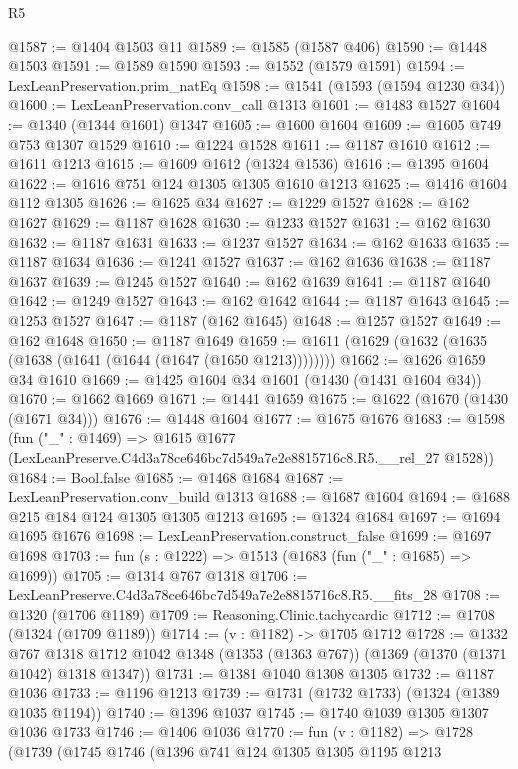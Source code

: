 \begin{lexlean}{R5}
\begin{coremodule}
@1587 := @1404 @1503 @11
@1589 := @1585 (@1587 @406)
@1590 := @1448 @1503
@1591 := @1589 @1590
@1593 := @1552 (@1579 @1591)
@1594 := LexLeanPreservation.prim_natEq
@1598 := @1541 (@1593 (@1594 @1230 @34))
@1600 := LexLeanPreservation.conv_call @1313
@1601 := @1483 @1527
@1604 := @1340 (@1344 @1601) @1347
@1605 := @1600 @1604
@1609 := @1605 @749 @753 @1307 @1529
@1610 := @1224 @1528
@1611 := @1187 @1610
@1612 := @1611 @1213
@1615 := @1609 @1612 (@1324 @1536)
@1616 := @1395 @1604
@1622 := @1616 @751 @124 @1305 @1305 @1610 @1213
@1625 := @1416 @1604 @112 @1305
@1626 := @1625 @34
@1627 := @1229 @1527
@1628 := @162 @1627
@1629 := @1187 @1628
@1630 := @1233 @1527
@1631 := @162 @1630
@1632 := @1187 @1631
@1633 := @1237 @1527
@1634 := @162 @1633
@1635 := @1187 @1634
@1636 := @1241 @1527
@1637 := @162 @1636
@1638 := @1187 @1637
@1639 := @1245 @1527
@1640 := @162 @1639
@1641 := @1187 @1640
@1642 := @1249 @1527
@1643 := @162 @1642
@1644 := @1187 @1643
@1645 := @1253 @1527
@1647 := @1187 (@162 @1645)
@1648 := @1257 @1527
@1649 := @162 @1648
@1650 := @1187 @1649
@1659 := @1611 (@1629 (@1632 (@1635 (@1638 (@1641 (@1644 (@1647 (@1650 @1213))))))))
@1662 := @1626 @1659 @34 @1610
@1669 := @1425 @1604 @34 @1601 (@1430 (@1431 @1604 @34))
@1670 := @1662 @1669
@1671 := @1441 @1659
@1675 := @1622 (@1670 (@1430 (@1671 @34)))
@1676 := @1448 @1604
@1677 := @1675 @1676
@1683 := @1598
    (fun ("_" : @1469) =>
    @1615 @1677 (LexLeanPreserve.C4d3a78ce646bc7d549a7e2e8815716c8.R5.__rel_27 @1528))
@1684 := Bool.false
@1685 := @1468 @1684
@1687 := LexLeanPreservation.conv_build @1313
@1688 := @1687 @1604
@1694 := @1688 @215 @184 @124 @1305 @1305 @1213
@1695 := @1324 @1684
@1697 := @1694 @1695 @1676
@1698 := LexLeanPreservation.construct_false
@1699 := @1697 @1698
@1703 := fun (s : @1222) => @1513 (@1683 (fun ("_" : @1685) => @1699))
@1705 := @1314 @767 @1318
@1706 := LexLeanPreserve.C4d3a78ce646bc7d549a7e2e8815716c8.R5.__fits_28
@1708 := @1320 (@1706 @1189)
@1709 := Reasoning.Clinic.tachycardic
@1712 := @1708 (@1324 (@1709 @1189))
@1714 := (v : @1182) -> @1705 @1712
@1728 := @1332
    @767
    @1318
    @1712
    @1042
    @1348
    (@1353 (@1363 @767))
    (@1369 (@1370 (@1371 @1042) @1318 @1347))
@1731 := @1381 @1040 @1308 @1305
@1732 := @1187 @1036
@1733 := @1196 @1213
@1739 := @1731 (@1732 @1733) (@1324 (@1389 @1035 @1194))
@1740 := @1396 @1037
@1745 := @1740 @1039 @1305 @1307 @1036 @1733
@1746 := @1406 @1036
@1770 := fun (v : @1182) =>
  @1728
    (@1739
      (@1745
        @1746
        (@1396
          @741
          @124
          @1305
          @1305
          @1195
          @1213

\end{coremodule}
\end{lexlean}
